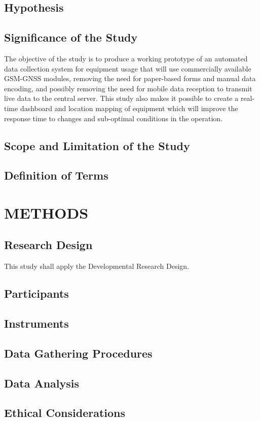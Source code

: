 \documentclass[12pt]{report}
\begin{document}
\section{Hypothesis}

\section{Significance of the Study}

The objective of the study is to produce a working prototype of an automated data collection system for equipment usage that will use commercially available GSM-GNSS modules, removing the need for paper-based forms and manual data encoding, and possibly removing the need for mobile data reception to transmit live data to the central server.
This study also makes it possible to create a real-time dashboard and location mapping of equipment which will improve the response time to changes and sub-optimal conditions in the operation.

\section{Scope and Limitation of the Study}

\section{Definition of Terms}

\chapter{METHODS}

\section{Research Design}

This study shall apply the Developmental Research Design.

\section{Participants}

\section{Instruments}

\section{Data Gathering Procedures}

\section{Data Analysis}

\section{Ethical Considerations}

\printbibliography[
    title = {REFERENCES},
    heading = bibintoc
]
\end{document}
